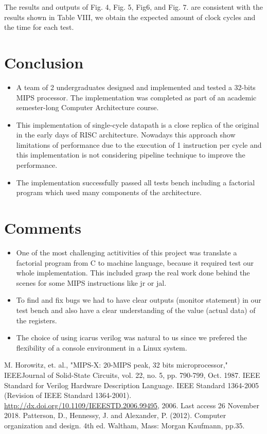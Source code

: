 \documentclass[conference]{IEEEtran}
\begin{document}
The results and outputs of Fig. 4, Fig. 5, Fig6, and Fig. 7. are consistent with the results shown in Table VIII, we obtain the expected amount of clock cycles and the time for each test.
 
\section{Conclusion}
\begin{itemize}
\item A team of 2 undergraduates designed and implemented and tested a 32-bits MIPS processor. The implementation was completed as part of an academic semester-long Computer Architecture course.
\item This implementation of single-cycle datapath is a close replica of the original in the early days of RISC architecture. Nowadays this approach show limitations of performance due to the execution of 1 instruction per cycle and this implementation is not considering pipeline technique to improve the performance.
\item The implementation successfully passed all tests bench including a factorial program which used many components of the architecture.
\end{itemize}
\section{Comments}
\begin{itemize}
\item One of the most challenging actitivities of this project was translate a factorial program from C to machine language, because it required test our whole implementation. This included grasp the real work done behind the scenes for some MIPS instructions like jr or jal.
\item To find and fix bugs we had to have clear outputs (monitor statement) in our test bench and also have a clear understanding of the value (actual data) of the registers.
\item The choice of using icarus verilog was natural to us since we prefered the flexibility of a console environment in a Linux system.
\end{itemize}

\begin{thebibliography}{00}
 M. Horowitz, et. al., "MIPS-X: 20-MIPS peak, 32 bits microprocessor," IEEEJournal of Solid-State Circuits, vol. 22, no. 5, pp. 790-799, Oct. 1987.
 IEEE Standard for Verilog Hardware Description Language. IEEE Standard 1364-2005 (Revision of IEEE Standard 1364-2001). \url{http://dx.doi.org/10.1109/IEEESTD.2006.99495}, 2006. Last access 26 November 2018.
 Patterson, D., Hennessy, J. and Alexander, P. (2012). Computer organization and design. 4th ed. Waltham, Mass: Morgan Kaufmann, pp.35.
\end{thebibliography}
\vspace{12pt}
\end{document}
